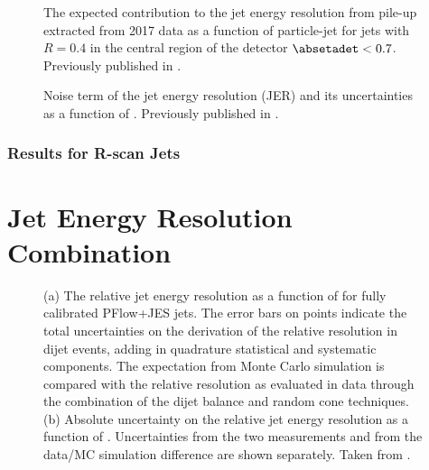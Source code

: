 \begin{figure}
    \caption{The expected contribution to the jet energy resolution from pile-up extracted from 2017 data as a function of particle-jet \pT for \antikt jets with $R = 0.4$ in the central region of the detector $\absetadet < 0.7$. Previously published in .}
    \label{fig:pile-up-jer-vs-pt}
\end{figure}


\begin{figure}
    \caption{Noise term of the jet energy resolution (JER) and its uncertainties as a function of \abseta. Previously published in .}
    \label{fig:noise-term-results-pflow}
\end{figure}



\subsubsection{Results for R-scan Jets}


\section{Jet Energy Resolution Combination}

\begin{figure}
    \caption{(a) The relative jet energy resolution as a function of \pT for fully calibrated PFlow+JES jets. The error bars on points indicate the total uncertainties on the derivation of the relative resolution in dijet events, adding in quadrature statistical and systematic components. The expectation from Monte Carlo simulation is compared with the relative resolution as evaluated in data through the combination of the dijet balance and random cone techniques. (b) Absolute uncertainty on the relative jet energy resolution as a function of \pTjet. Uncertainties from the two \insitu measurements and from the data/MC simulation difference are shown separately. Taken from .}
    \label{fig:jer-combination-incl-noise-term}
\end{figure}


